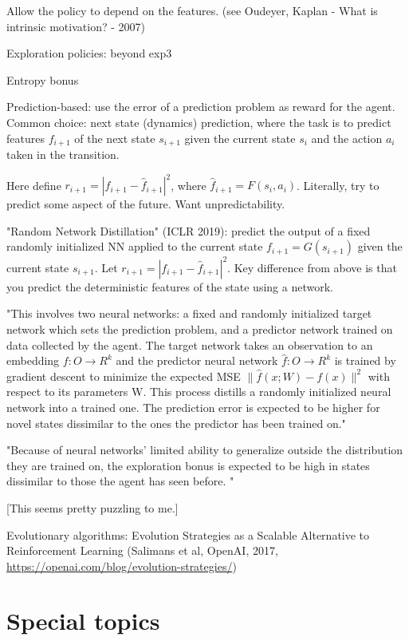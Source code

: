 \documentclass[english]{article}
\begin{document}
Allow the policy to depend on the features. (see Oudeyer, Kaplan - What is intrinsic motivation?  - 2007)

\item Exploration policies: beyond exp3

Entropy bonus

Prediction-based: use the error of a prediction problem as reward for the agent. Common choice: next state (dynamics) prediction, where the task is to predict features $f_{i+1}$ of the next state $s_{i+1}$ given the current state $s_i$ and the action $a_i$ taken in the transition. 

Here define $r_{i+1} = |f_{i+1}-\hat f_{i+1}|^2$, where $\hat f_{i+1} = F(s_{i},a_i)$. Literally, try to predict some aspect of the future. Want unpredictability.


"Random Network Distillation" (ICLR 2019): predict the output of a fixed randomly initialized NN applied to the current state $f_{i+1} = G(s_{i+1})$ given the current state $s_{i+1}$. Let $r_{i+1} = |f_{i+1}-\hat f_{i+1}|^2$. Key difference from above is that you predict the deterministic features of the state using a network. 

"This involves two neural networks: a fixed and randomly initialized target network which sets the
prediction problem, and a predictor network trained on data collected by the agent. The target network
takes an observation to an embedding $f : O \to R^k$ and the predictor neural network $\hat f : O \to R^k$
is trained by gradient descent to minimize the expected MSE $\|\hat f(x;W) − f(x)\|^2$ with respect to its
parameters W. This process distills a randomly initialized neural network into a trained one. The
prediction error is expected to be higher for novel states dissimilar to the ones the predictor has been
trained on."

"Because of neural networks' limited ability to generalize outside the distribution they are trained on, the exploration bonus is expected to be high in states dissimilar to those the agent has seen before. "


[This seems pretty puzzling to me.]

\item Evolutionary algorithms: Evolution Strategies as a Scalable Alternative to Reinforcement Learning (Salimans et al, OpenAI, 2017, \url{https://openai.com/blog/evolution-strategies/})


\eenum 

\section{Special topics}
%
\end{document}
